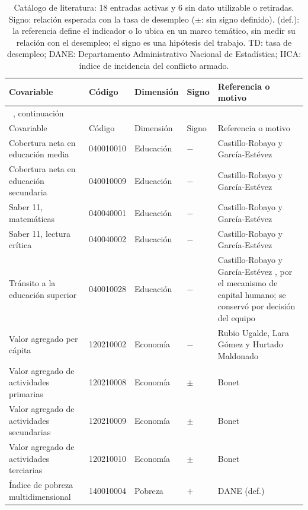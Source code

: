 {\footnotesize\setlength{\tabcolsep}{3pt}
\begin{longtable}{p{2.8cm} p{1.5cm} p{2.0cm} p{0.8cm} p{4.6cm}}
\caption[Catálogo de covariables de la literatura]{Catálogo de literatura: 18 entradas activas y 6 sin dato utilizable o retiradas. Signo: relación esperada con la tasa de desempleo ($\pm$: sin signo definido). (def.): la referencia define el indicador o lo ubica en un marco temático, sin medir su relación con el desempleo; el signo es una hipótesis del trabajo. TD: tasa de desempleo; DANE: Departamento Administrativo Nacional de Estadística; IICA: índice de incidencia del conflicto armado.}
\label{tab:app_catalogo} \\
\toprule
Covariable & Código & Dimensión & Signo & Referencia o motivo \\
\midrule
\endfirsthead
\multicolumn{5}{l}{\tablename~\thetable{}, continuación} \\
\toprule
Covariable & Código & Dimensión & Signo & Referencia o motivo \\
\midrule
\endhead
\bottomrule
\endlastfoot
Cobertura neta en educación media & 040010010 & Educación & $-$ & Castillo-Robayo y García-Estévez \cite{CastilloGarcia2019} \\
Cobertura neta en educación secundaria & 040010009 & Educación & $-$ & Castillo-Robayo y García-Estévez \cite{CastilloGarcia2019} \\
Saber 11, matemáticas & 040040001 & Educación & $-$ & Castillo-Robayo y García-Estévez \cite{CastilloGarcia2019} \\
Saber 11, lectura crítica & 040040002 & Educación & $-$ & Castillo-Robayo y García-Estévez \cite{CastilloGarcia2019} \\
Tránsito a la educación superior & 040010028 & Educación & $-$ & Castillo-Robayo y García-Estévez \cite{CastilloGarcia2019}, por el mecanismo de capital humano; se conservó por decisión del equipo \\
Valor agregado per cápita & 120210002 & Economía & $-$ & Rubio Ugalde, Lara Gómez y Hurtado Maldonado \cite{RubioUgalde2025} \\
Valor agregado de actividades primarias & 120210008 & Economía & $\pm$ & Bonet \cite{Bonet2005} \\
Valor agregado de actividades secundarias & 120210009 & Economía & $\pm$ & Bonet \cite{Bonet2005} \\
Valor agregado de actividades terciarias & 120210010 & Economía & $\pm$ & Bonet \cite{Bonet2005} \\
Índice de pobreza multidimensional & 140010004 & Pobreza & $+$ & DANE \cite{DANE_IPM2020} (def.) \\

\end{longtable}}
